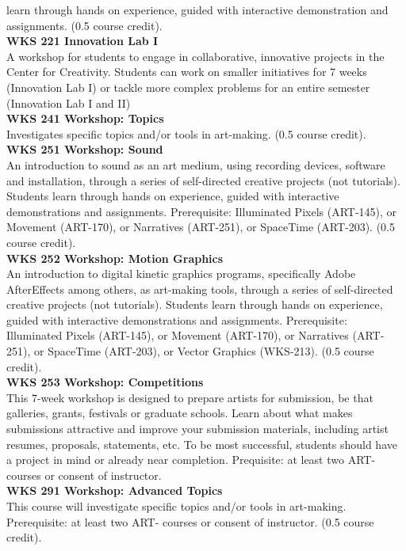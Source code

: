 \documentclass[
  letterpaper,
]{scrbook}
\begin{document}
learn through hands on experience, guided with interactive demonstration
and assignments. (0.5 course credit).\\
\textbf{WKS 221 Innovation Lab I}\\
A workshop for students to engage in collaborative, innovative projects
in the Center for Creativity. Students can work on smaller initiatives
for 7 weeks (Innovation Lab I) or tackle more complex problems for an
entire semester (Innovation Lab I and II)\\
\textbf{WKS 241 Workshop: Topics}\\
Investigates specific topics and/or tools in art-making. (0.5 course
credit).\\
\textbf{WKS 251 Workshop: Sound}\\
An introduction to sound as an art medium, using recording devices,
software and installation, through a series of self-directed creative
projects (not tutorials). Students learn through hands on experience,
guided with interactive demonstrations and assignments. Prerequisite:
Illuminated Pixels (ART-145), or Movement (ART-170), or Narratives
(ART-251), or SpaceTime (ART-203). (0.5 course credit).\\
\textbf{WKS 252 Workshop: Motion Graphics}\\
An introduction to digital kinetic graphics programs, specifically Adobe
AfterEffects among others, as art-making tools, through a series of
self-directed creative projects (not tutorials). Students learn through
hands on experience, guided with interactive demonstrations and
assignments. Prerequisite: Illuminated Pixels (ART-145), or Movement
(ART-170), or Narratives (ART-251), or SpaceTime (ART-203), or Vector
Graphics (WKS-213). (0.5 course credit).\\
\textbf{WKS 253 Workshop: Competitions}\\
This 7-week workshop is designed to prepare artists for submission, be
that galleries, grants, festivals or graduate schools. Learn about what
makes submissions attractive and improve your submission materials,
including artist resumes, proposals, statements, etc. To be most
successful, students should have a project in mind or already near
completion. Prequisite: at least two ART- courses or consent of
instructor.\\
\textbf{WKS 291 Workshop: Advanced Topics}\\
This course will investigate specific topics and/or tools in art-making.
Prerequisite: at least two ART- courses or consent of instructor. (0.5
course credit).
\end{document}
